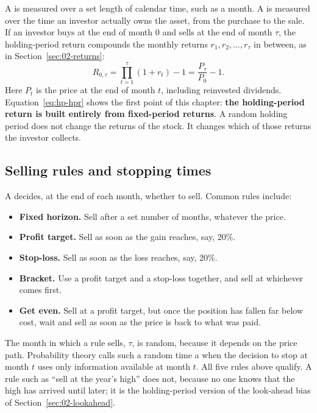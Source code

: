 A  is measured over a set length of calendar time, such as a month. A  is measured over the time an investor actually owns the asset, from the purchase to the sale. If an investor buys at the end of month 0 and sells at the end of month $\tau$, the holding-period return compounds the monthly returns $r_1, r_2, \ldots, r_\tau$ in between, as in Section~\ref{sec:02-returns}:
\begin{equation}
  R_{0,\tau} = \prod_{t=1}^{\tau} (1 + r_t) - 1 = \frac{P_\tau}{P_0} - 1 .
  \label{eq:hp-hpr}
\end{equation}
Here $P_t$ is the price at the end of month $t$, including reinvested dividends. Equation~\eqref{eq:hp-hpr} shows the first point of this chapter: \textbf{the holding-period return is built entirely from fixed-period returns}. A random holding period does not change the returns of the stock. It changes which of those returns the investor collects.

\subsection{Selling rules and stopping times}

A  decides, at the end of each month, whether to sell. Common rules include:

\begin{itemize}
  \item \textbf{Fixed horizon.} Sell after a set number of months, whatever the price.
  \item \textbf{Profit target.} Sell as soon as the gain reaches, say, 20\%.
  \item \textbf{Stop-loss.} Sell as soon as the loss reaches, say, 20\%.
  \item \textbf{Bracket.} Use a profit target and a stop-loss together, and sell at whichever comes first.
  \item \textbf{Get even.} Sell at a profit target, but once the position has fallen far below cost, wait and sell as soon as the price is back to what was paid.
\end{itemize}

The month in which a rule sells, $\tau$, is random, because it depends on the price path. Probability theory calls such a random time a  when the decision to stop at month $t$ uses only information available at month $t$. All five rules above qualify. A rule such as ``sell at the year's high'' does not, because no one knows that the high has arrived until later; it is the holding-period version of the look-ahead bias of Section~\ref{sec:02-lookahead}.

